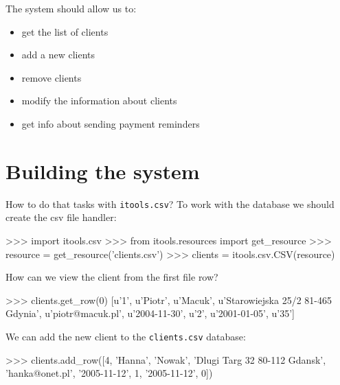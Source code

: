 \documentclass[a4paper]{book}
\begin{document}
The system should allow us to:
\begin{itemize}
    \item get the list of clients
    \item add a new clients
    \item remove clients 
    \item modify the information about clients
    \item get info about sending payment reminders 
\end{itemize}


\section{Building the system}

How to do that tasks with {\tt itools.csv}? To work with the
database we should create the csv file handler:
\begin{code}
    >>> import itools.csv
    >>> from itools.resources import get_resource
    >>> resource = get_resource('clients.csv')
    >>> clients = itools.csv.CSV(resource)
\end{code}

How can we view the client from the first file row?
\begin{code}
    >>> clients.get_row(0)
    [u'1', u'Piotr', u'Macuk', u'Starowiejska 25/2 81-465 Gdynia',
    u'piotr@macuk.pl', u'2004-11-30', u'2', u'2001-01-05', u'35']
\end{code}
    
We can add the new client to the {\tt clients.csv} database:
\begin{code}
    >>> clients.add_row([4, 'Hanna', 'Nowak', 'Dlugi Targ 32 80-112 Gdansk',
    'hanka@onet.pl', '2005-11-12', 1, '2005-11-12', 0])
\end{code}
\end{document}
